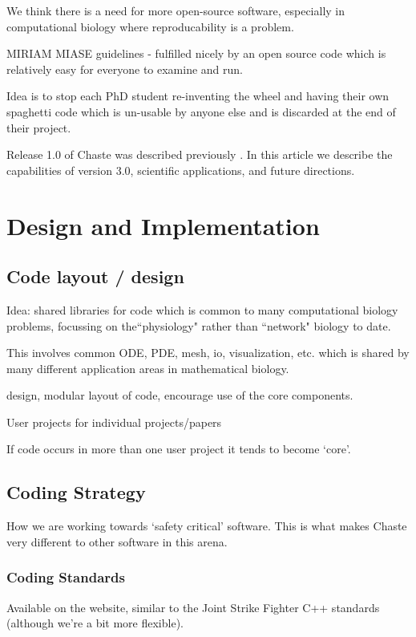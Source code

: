 \documentclass[10pt]{article}
\begin{document}
We think there is a need for more open-source software, especially in computational biology where reproducability is a problem.

MIRIAM \cite{Novere2005} MIASE \cite{Waltemath2011} guidelines - fulfilled nicely by an open source code which is relatively easy for everyone to examine and run.

Idea is to stop each PhD student re-inventing the wheel and having their own spaghetti code which is un-usable by anyone else and is discarded at the end of their project.

Release 1.0 of Chaste was described previously \cite{Bernabeu2008,pitt2009chaste}. 
In this article we describe the capabilities of version 3.0, scientific applications, and future directions. 

\section*{Design and Implementation}

\subsection*{Code layout / design}
Idea: shared libraries for code which is common to many computational biology problems, focussing on the``physiology" rather than ``network" biology to date.

This involves common ODE, PDE, mesh, io, visualization, etc. which is shared by many different application areas in mathematical biology.

design, modular layout of code, encourage use of the core components.

User projects for individual projects/papers

If code occurs in more than one user project it tends to become `core'.

\subsection*{Coding Strategy}

How we are working towards `safety critical' software. This is what makes Chaste very different to other software in this arena.

\subsubsection*{Coding Standards}

Available on the website, similar to the Joint Strike Fighter C++ standards (although we're a bit more flexible).
\end{document}
